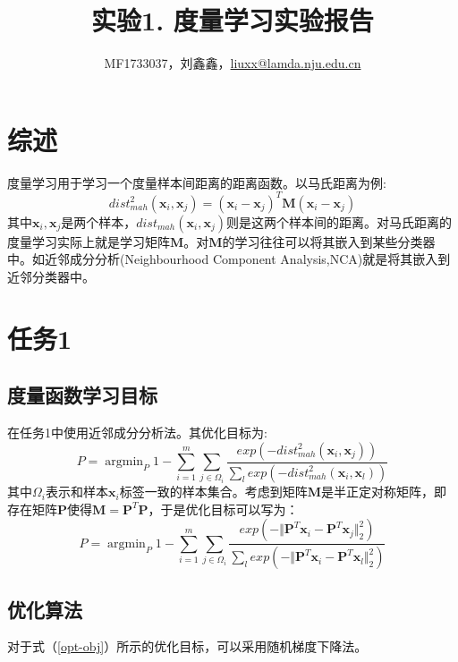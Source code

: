\documentclass[a4paper,UTF8]{article}
\theoremstyle{definition}
\begin{document}
\title{实验1. 度量学习实验报告}
\author{MF1733037，刘鑫鑫，\url{liuxx@lamda.nju.edu.cn}}
\maketitle

\section*{综述}
度量学习用于学习一个度量样本间距离的距离函数。以马氏距离为例:
\begin{equation}\label{mah}
dist^2_{mah}(\bm x_i,\bm x_j)=(\bm x_i-\bm x_j)^T\bm M(\bm x_i-\bm x_j)
\end{equation}
其中$\bm x_i,\bm x_j$是两个样本，$dist_{mah}(\bm x_i,\bm x_j)$则是这两个样本间的距离。对马氏距离的度量学习实际上就是学习矩阵$\bm M$。对$\bm M$的学习往往可以将其嵌入到某些分类器中。如近邻成分分析(Neighbourhood Component Analysis,NCA)就是将其嵌入到近邻分类器中。

\section*{任务1}
	\subsection*{度量函数学习目标}
		在任务1中使用近邻成分分析法。其优化目标为:
\begin{equation}
P = \mathop{\arg\min}_P 1-\sum^m_{i=1}\sum_{j\in\Omega_i}\frac{exp(-dist^2_{mah}(\bm x_i,\bm x_j))}{\sum_l exp(-dist^2_{mah}(\bm x_i,\bm x_l))}
\end{equation}
其中$\Omega_i$表示和样本$\bm x_i$标签一致的样本集合。考虑到矩阵$\bm M$是半正定对称矩阵，即存在矩阵$\bm P$使得$\bm M=\bm P^T\bm P$，于是优化目标可以写为：
\begin{equation}\label{opt-obj}
P = \mathop{\arg\min}_P 1-\sum^m_{i=1}\sum_{j\in\Omega_i}\frac{exp(-\Vert\bm P^T\bm x_i-\bm P^T\bm x_j\Vert_2^2)}{\sum_l exp(-\Vert\bm P^T\bm x_i-\bm P^T\bm x_l\Vert_2^2)}
\end{equation}
	\subsection*{优化算法}
对于式（\ref{opt-obj}）所示的优化目标，可以采用随机梯度下降法。\\
\end{document}
